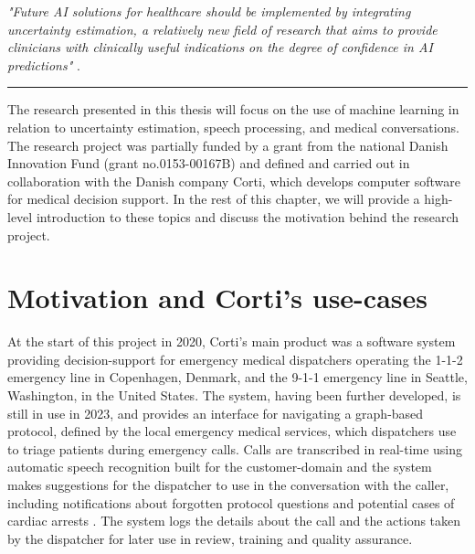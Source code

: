\begin{center}

\textit{"Future AI solutions for healthcare should be implemented by integrating uncertainty estimation, a relatively new field of research that aims to provide clinicians with clinically useful indications on the degree of confidence in AI predictions"} \cite{europeanparliament_artificial_2022}. 

\end{center}


\vspace{1em}
\begin{center}
\noindent\rule{0.2\textwidth}{0.5pt}
\end{center}
\vspace{1em}

\noindent The research presented in this thesis will focus on the use of machine learning in relation to uncertainty estimation, speech processing, and medical conversations. 
The research project was partially funded by a grant from the national Danish Innovation Fund (grant no.\@ 0153-00167B) and defined and carried out in collaboration with the Danish company Corti, which develops computer software for medical decision support. 
In the rest of this chapter, we will provide a high-level introduction to these topics and discuss the motivation behind the research project.


\section{Motivation and Corti's use-cases}
%
%
At the start of this project in 2020, Corti's main product was a software system providing decision-support for emergency medical dispatchers operating the 1-1-2 emergency line in Copenhagen, Denmark, and the 9-1-1 emergency line in Seattle, Washington, in the United States.
The system, having been further developed, is still in use in 2023, and provides an interface for navigating a graph-based protocol, defined by the local emergency medical services, which dispatchers use to triage patients during emergency calls. 
Calls are transcribed in real-time using automatic speech recognition built for the customer-domain and the system makes suggestions for the dispatcher to use in the conversation with the caller, including notifications about forgotten protocol questions \cite{havtorn_multiqt_2020} and potential cases of cardiac arrests \cite{cite15, cite14}. The system logs the details about the call and the actions taken by the dispatcher for later use in review, training and quality assurance. 



